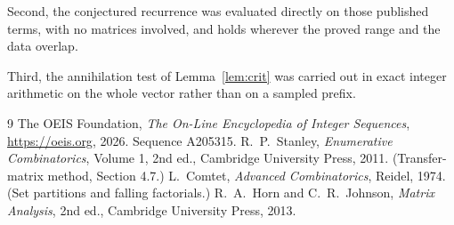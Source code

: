 \documentclass[11pt,a4paper]{article}
\theoremstyle{plain}
\theoremstyle{definition}
\begin{document}
Second, the conjectured recurrence was evaluated directly on those published terms, with no
matrices involved, and holds wherever the proved range and the data overlap.

Third, the annihilation test of Lemma~\ref{lem:crit} was carried out in exact integer
arithmetic on the whole vector rather than on a sampled prefix.

\begin{thebibliography}{9}
 The OEIS Foundation, \emph{The On-Line Encyclopedia of Integer
Sequences}, \url{https://oeis.org}, 2026. Sequence A205315.
 R.~P.~Stanley, \emph{Enumerative Combinatorics}, Volume 1, 2nd ed.,
Cambridge University Press, 2011. (Transfer-matrix method, Section 4.7.)
 L.~Comtet, \emph{Advanced Combinatorics}, Reidel, 1974. (Set partitions
and falling factorials.)
 R.~A.~Horn and C.~R.~Johnson, \emph{Matrix Analysis}, 2nd ed., Cambridge
University Press, 2013.
\end{thebibliography}
\end{document}
